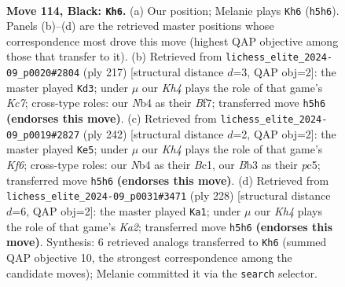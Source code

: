 \documentclass[11pt]{article}
\begin{document}
\clearpage

\begin{figure}[p]\centering
\begin{subfigure}{0.46\textwidth}\centering
\resizebox{\linewidth}{!}{%
\newchessgame
\chessboard[
  setfen={8/8/8/7k/1n1B4/1b5K/5P2/8 b - - 74 114},
  showmover=false,
  pgfstyle=straightmove, color=movearrow, markmove={h5-h6}
]}
\caption{}
\end{subfigure}\hfill
\begin{subfigure}{0.46\textwidth}\centering
\resizebox{\linewidth}{!}{%
\newchessgame
\chessboard[
  setfen={8/5b2/5P2/8/1K1B4/8/2k5/8 b - - 32 109},
  showmover=false,
  pgfstyle=straightmove, color=movearrow, markmove={c2-d3}
]}
\caption{}
\end{subfigure}
\\[4pt]
\begin{subfigure}{0.46\textwidth}\centering
\resizebox{\linewidth}{!}{%
\newchessgame
\chessboard[
  setfen={8/7k/b4K2/2p5/8/3p4/8/2B5 w - - 0 122},
  showmover=false,
  pgfstyle=straightmove, color=movearrow, markmove={f6-e5}
]}
\caption{}
\end{subfigure}\hfill
\begin{subfigure}{0.46\textwidth}\centering
\resizebox{\linewidth}{!}{%
\newchessgame
\chessboard[
  setfen={8/8/p7/8/1k6/3b4/K7/8 w - - 40 115},
  showmover=false,
  pgfstyle=straightmove, color=movearrow, markmove={a2-a1}
]}
\caption{}
\end{subfigure}
\caption{\textbf{Move 114, Black: \texttt{Kh6}.} (a) Our position; Melanie plays \texttt{Kh6} (\texttt{h5h6}). Panels (b)--(d) are the retrieved master positions whose correspondence most drove this move (highest QAP objective among those that transfer to it). (b) Retrieved from \texttt{lichess\_elite\_2024-09\_p0020\#2804} (ply 217) [structural distance $d$=3, QAP obj=2]: the master played \texttt{Kd3}; under $\mu$ our \emph{Kh4} plays the role of that game's \emph{Kc7}; cross-type roles: our \emph{N}b4 as their \emph{B}f7; transferred move \texttt{h5h6} \textbf{(endorses this move)}. (c) Retrieved from \texttt{lichess\_elite\_2024-09\_p0019\#2827} (ply 242) [structural distance $d$=2, QAP obj=2]: the master played \texttt{Ke5}; under $\mu$ our \emph{Kh4} plays the role of that game's \emph{Kf6}; cross-type roles: our \emph{N}b4 as their \emph{B}c1, our \emph{B}b3 as their \emph{p}c5; transferred move \texttt{h5h6} \textbf{(endorses this move)}. (d) Retrieved from \texttt{lichess\_elite\_2024-09\_p0031\#3471} (ply 228) [structural distance $d$=6, QAP obj=2]: the master played \texttt{Ka1}; under $\mu$ our \emph{Kh4} plays the role of that game's \emph{Ka2}; transferred move \texttt{h5h6} \textbf{(endorses this move)}. Synthesis: 6 retrieved analogs transferred to \texttt{Kh6} (summed QAP objective 10, the strongest correspondence among the candidate moves); Melanie committed it via the \texttt{search} selector.}
\label{fig:thought-m227}
\end{figure}
\end{document}
